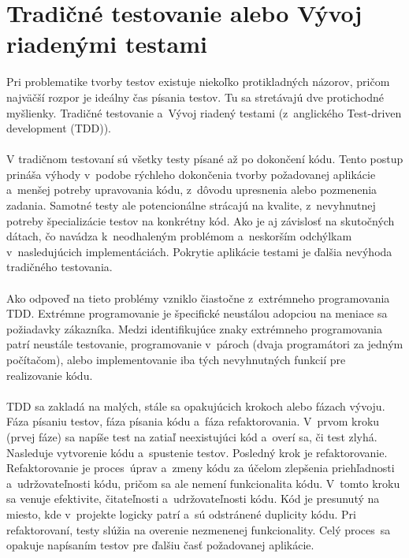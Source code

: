 \documentclass[
  digital, %
  table,   %
oneside,
  nolof,     %
  nolot,     %
]{fithesis3}
\begin{document}
\section{Tradičné testovanie alebo Vývoj riadenými testami}

Pri problematike tvorby testov existuje niekoľko protikladných názorov, pričom najväčší rozpor je ideálny čas písania testov. Tu sa stretávajú dve protichodné myšlienky. Tradičné testovanie a~Vývoj riadený testami (z~anglického  Test-driven development (TDD))\cite{softwareTesting}. \paragraph{}
V tradičnom testovaní sú všetky testy písané až po dokončení kódu. Tento postup prináša výhody v~podobe rýchleho dokončenia tvorby požadovanej aplikácie a~menšej potreby upravovania kódu, z~dôvodu upresnenia alebo pozmenenia zadania.
Samotné testy ale potencionálne strácajú na kvalite, z~nevyhnutnej  potreby špecializácie testov na konkrétny kód. Ako je aj závislosť na skutočných dátach, čo navádza k~neodhaleným problémom a~neskorším odchýlkam v~nasledujúcich implementáciách. Pokrytie aplikácie testami je ďalšia nevýhoda tradičného testovania.  \paragraph{}
Ako odpoveď na tieto problémy vzniklo čiastočne z~extrémneho programovania TDD. Extrémne programovanie je špecifické neustálou adopciou na meniace sa požiadavky zákazníka. Medzi identifikujúce znaky extrémneho programovania patrí neustále testovanie, programovanie v~pároch (dvaja programátori za jedným počítačom), alebo implementovanie  iba tých nevyhnutných funkcií pre realizovanie kódu. \paragraph{}
TDD sa zakladá na malých, stále sa opakujúcich krokoch alebo fázach vývoju. Fáza písaniu testov, fáza písania kódu a~fáza refaktorovania.
V~prvom kroku (prvej fáze) sa napíše test na zatiaľ neexistujúci kód a~overí sa, či test zlyhá. Nasleduje vytvorenie kódu a~spustenie testov. Posledný krok je refaktorovanie. Refaktorovanie je proces~úprav a~zmeny kódu za účelom zlepšenia priehľadnosti a~udržovateľnosti kódu, pričom sa ale nemení funkcionalita kódu. V~tomto kroku sa venuje efektivite, čitateľnosti a~udržovateľnosti kódu. Kód je presunutý na miesto, kde v~projekte logicky patrí a~sú odstránené duplicity kódu. Pri refaktorovaní, testy slúžia na overenie nezmenenej funkcionality. Celý proces~sa opakuje napísaním testov pre ďalšiu časť požadovanej aplikácie.
\end{document}
